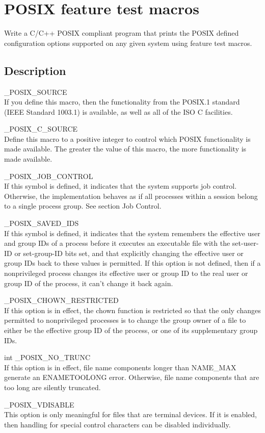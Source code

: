 \chapter{POSIX feature test macros}

Write a C/C++ POSIX compliant program that prints the POSIX defined configuration options supported on any given system using feature test macros.

\section{Description}

\begin{description}

	\item \_POSIX\_SOURCE \hfill \\
		If you define this macro, then the functionality from the POSIX.1 standard (IEEE Standard 1003.1) is available, as well as all of the ISO C facilities.
	\item \_POSIX\_C\_SOURCE \hfill \\
		Define this macro to a positive integer to control which POSIX functionality is made available. The greater the value of this macro, the more functionality is made available.
	\item \_POSIX\_JOB\_CONTROL \hfill \\
		If this symbol is defined, it indicates that the system supports job control. Otherwise, the implementation behaves as if all processes within a session belong to a single process group. See section Job Control.
	\item \_POSIX\_SAVED\_IDS \hfill \\
		If this symbol is defined, it indicates that the system remembers the effective user and group IDs of a process before it executes an executable file with the set-user-ID or set-group-ID bits set, and that explicitly changing the effective user or group IDs back to these values is permitted. If this option is not defined, then if a nonprivileged process changes its effective user or group ID to the real user or group ID of the process, it can't change it back again.
	\item \_POSIX\_CHOWN\_RESTRICTED \hfill \\
		If this option is in effect, the chown function is restricted so that the only changes permitted to nonprivileged processes is to change the group owner of a file to either be the effective group ID of the process, or one of its supplementary group IDs. 
	\item int \_POSIX\_NO\_TRUNC \hfill \\
		If this option is in effect, file name components longer than NAME\_MAX generate an ENAMETOOLONG error. Otherwise, file name components that are too long are silently truncated.
	\item \_POSIX\_VDISABLE \hfill \\
		This option is only meaningful for files that are terminal devices. If it is enabled, then handling for special control characters can be disabled individually.
	
\end{description}

